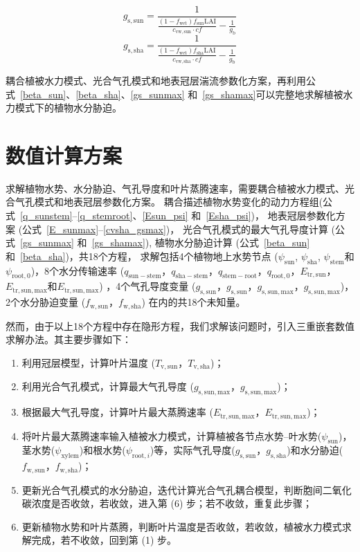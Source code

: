 \begin{equation}\label{gssun_cvsun}
  g_{\mathrm{s,sun}} = \frac{1}{\frac{(1-f_{\mathrm{wet}})f_{\mathrm{sun}}\text{LAI}}{c_{\mathrm{vw,sun}}\cdot cf}-\frac{1}{g_{\mathrm {b}}}}
\end{equation}
\begin{equation}\label{gssun_cvsha}
  g_{\mathrm{s,sha}} = \frac{1}{\frac{(1-f_{\mathrm{wet}})f_{\mathrm{sha}}\text{LAI}}{c_{\mathrm{vw,sha}}\cdot cf}-\frac{1}{g_{\mathrm {b}}}}
\end{equation}


耦合植被水力模式、光合气孔模式和地表冠层湍流参数化方案，再利用公式~\eqref{beta_sun}、\eqref{beta_sha}、\eqref{gs_sunmax} 和~\eqref{gs_shamax}可以完整地求解植被水力模式下的植物水分胁迫。


\section{数值计算方案}\label{数值计算方案}
求解植物水势、水分胁迫、气孔导度和叶片蒸腾速率，需要耦合植被水力模式、光合气孔模式和地表冠层参数化方案。
耦合描述植物水势变化的动力方程组(公式~\eqref{q_sunstem}--\eqref{q_stemroot}、\eqref{Esun_psi} 和~\eqref{Esha_psi})，
地表冠层参数化方案 (公式~\eqref{E_sunmax}--\eqref{cvsha_gsmax})，
光合气孔模式的最大气孔导度计算 (公式~\eqref{gs_sunmax} 和~\eqref{gs_shamax}), 植物水分胁迫计算 (公式~\eqref{beta_sun} 和~\eqref{beta_sha})，共18个方程，
求解包括4个植物地上水势节点 ($\psi_{\mathrm{sun}}$, $\psi_{\mathrm{sha}}$, $\psi_{\mathrm{stem}}$和$\psi_{\mathrm{root,0}}$)，8个水分传输速率
($q_{\mathrm{sun-stem}}$，$q_{\mathrm{sha-stem}}$，$q_{\mathrm{stem-root}}$，$q_{\mathrm{root,0}}$，$E_{\mathrm{tr,sun}}$，$E_{\mathrm{tr,sun,max}}$和$E_{\mathrm{tr,sun,max}}$) ，4个气孔导度变量
($g_{\mathrm{s,sun}}$，$g_{\mathrm{s,sun}}$，$g_{\mathrm{s,sun,max}}$，$g_{\mathrm{s,sun,max}}$)，2个水分胁迫变量 ($f_{\mathrm{w,sun}}$，$f_{\mathrm{w,sha}}$) 在内的共18个未知量。

然而，由于以上18个方程中存在隐形方程，我们求解该问题时，引入三重嵌套数值求解办法。其主要步骤如下：
\begin{enumerate}
  \item 利用冠层模型，计算叶片温度 ($T_{\mathrm{v,sun}}$，$T_{\mathrm{v,sha}}$)；
  \item 利用光合气孔模式，计算最大气孔导度 ($g_{\mathrm{s,sun,max}}$，$g_{\mathrm{s,sun,max}}$)；
  \item 根据最大气孔导度，计算叶片最大蒸腾速率 ($E_{\mathrm{tr,sun,max}}$，$E_{\mathrm{tr,sun,max}}$)；
  \item 将叶片最大蒸腾速率输入植被水力模式，计算植被各节点水势--叶水势($\psi_{\mathrm{sun}}$)，茎水势($\psi_{\mathrm{xylem}}$)和根水势($\psi_{\mathrm{root},i}$)等，实际气孔导度($g_{\mathrm{s,sun}}$，$g_{\mathrm{s,sha}}$)和水分胁迫($f_{\mathrm{w,sun}}$，$f_{\mathrm{w,sha}}$)；
  \item 更新光合气孔模式的水分胁迫，迭代计算光合气孔耦合模型，判断胞间二氧化碳浓度是否收敛，若收敛，进入第 (6) 步；若不收敛，重复此步骤；
  \item 更新植物水势和叶片蒸腾，判断叶片温度是否收敛，若收敛，植被水力模式求解完成，若不收敛，回到第 (1) 步。
\end{enumerate}
